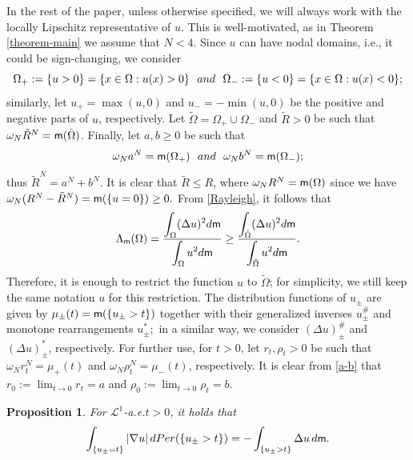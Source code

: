 \documentclass[11pt, reqno]{amsart}
\newtheorem{proposition}{Proposition}[section]
\numberwithin{equation}{section}
\begin{document}
	In the rest of the paper, unless otherwise specified, we will always work with the locally Lipschitz representative of $u$. This is well-motivated, as in Theorem \ref{theorem-main} we assume that $N<4$. Since $u$ can have nodal domains, i.e., it could be sign-changing, we consider 
	$$\Omega_+:=\{u>0\}=\{x\in \Omega: u(x)>0\}\ \ {\rm  and}\ \  \Omega_-:=\{u<0\}=\{x\in \Omega: u(x)<0\};$$
	similarly, let 
	$u_+=\max(u,0)$ and $u_-=-\min(u,0)$ be the positive and negative parts of $u$, respectively. Let $\tilde \Omega=\Omega_+\cup \Omega_-$ and $\tilde R>0$ be such that $\omega_N \tilde R^N={\sf m}(\tilde \Omega)$. Finally, let $a,b\geq 0$ be such that 
	\begin{equation}\label{a-b}
		\omega_N a^N={\sf m}(\Omega_+) \ \ {\rm and} \ \  \omega_N b^N={\sf m}(\Omega_-);
	\end{equation}
	thus  $\tilde R^N=a^N+b^N$. It is clear that $\tilde R\leq R$, where $\omega_N R^N={\sf m}(\Omega)$ since we have $\omega_N (R^N-\tilde R^N)={\sf m}(\{u=0\})\geq 0.$  
	From \eqref{Rayleigh}, it follows that
		\begin{equation}\label{Lieb-modified}
		\Lambda_{\sf m}(\Omega)= \frac{\displaystyle\int_\Omega (\Delta u)^2 {\rm d}{\sf m}}{\displaystyle\int_\Omega u^2 {\rm d}{\sf m}}\geq \frac{\displaystyle\int_{\tilde \Omega} (\Delta u)^2 {\rm d}{\sf m}}{\displaystyle\int_{\tilde \Omega} u^2 {\rm d}{\sf m}}.
	\end{equation}
	Therefore, it is enough to restrict the function $u$ to  $\tilde \Omega$; for simplicity, we still keep the same notation $u$ for this restriction. The distribution functions of $u_\pm$ are given by $\mu_\pm(t)={\sf m}(\{u_\pm>t\})$ together with their generalized inverses $u_\pm^\#$ and monotone rearrangements $u_\pm^*;$ in a similar way, we consider $(\Delta u)^\#_\pm$ and $(\Delta u)^*_\pm$, respectively.  For further use, for $t>0$, let $r_t,\rho_t>0$ be such that $\omega_N r_t^N=\mu_+(t)$ and $\omega_N \rho_t^N=\mu_-(t)$, respectively. It is clear from \eqref{a-b} that $r_0:=\lim_{t\to 0}r_t=a$ and  $\rho_0:=\lim_{t\to 0}\rho_t=b.$
	
	\begin{proposition}\label{prop-div-them}
		For $\mathcal L^1$-a.e.\;$t>0$,  it holds that
		\begin{equation}\label{eq:GaussGreen-u}
			\int_{\{u_\pm=t\}}|\nabla u|\, {\rm d}{\rm Per}(\{u_\pm>t\})=-\int_{\{u_\pm>t\}}\Delta u\, {\rm d}{\sf m}.
		\end{equation}
	\end{proposition}
	
\end{document}
